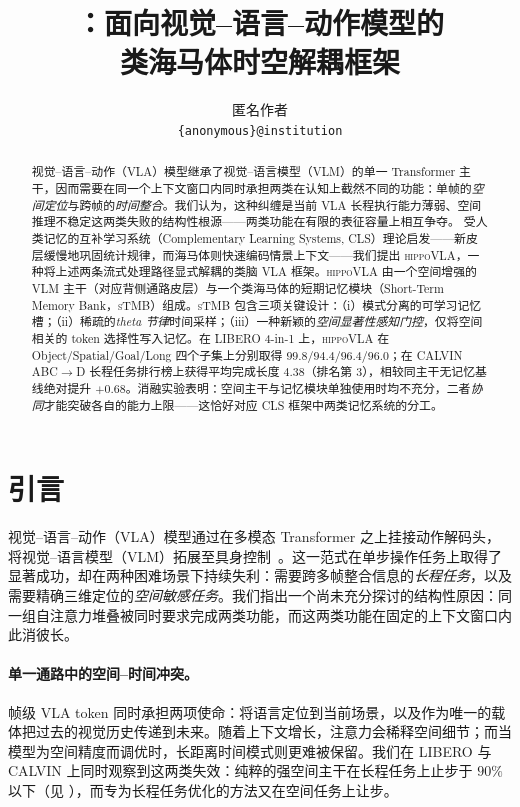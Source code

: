 \documentclass[10pt,letterpaper,fontset=fandol]{ctexart}
\title{\method：面向视觉--语言--动作模型的\\
类海马体时空解耦框架}
\author{
    匿名作者\\
    \texttt{\{anonymous\}@institution}
}
\date{}
\newcommand{\method}{\textsc{hippoVLA}\xspace}
\newcommand{\sTMB}{\textsc{sTMB}\xspace}
\begin{document}
\maketitle

\begin{abstract}
视觉--语言--动作（VLA）模型继承了视觉--语言模型（VLM）的单一 Transformer 主干，因而需要在同一个上下文窗口内同时承担两类在认知上截然不同的功能：单帧的\emph{空间定位}与跨帧的\emph{时间整合}。我们认为，这种纠缠是当前 VLA 长程执行能力薄弱、空间推理不稳定这两类失败的结构性根源——两类功能在有限的表征容量上相互争夺。
受人类记忆的互补学习系统（Complementary Learning Systems, CLS）理论启发——新皮层缓慢地巩固统计规律，而海马体则快速编码情景上下文——我们提出 \method，一种将上述两条流式处理路径显式解耦的类脑 VLA 框架。\method 由一个空间增强的 VLM 主干（对应背侧通路皮层）与一个类海马体的短期记忆模块（Short-Term Memory Bank，\sTMB）组成。\sTMB 包含三项关键设计：（i）模式分离的可学习记忆槽；（ii）稀疏的\emph{theta 节律}时间采样；（iii）一种新颖的\emph{空间显著性感知门控}，仅将空间相关的 token 选择性写入记忆。在 LIBERO 4-in-1 上，\method 在 Object/Spatial/Goal/Long 四个子集上分别取得 $99.8/94.4/96.4/96.0$；在 CALVIN ABC$\rightarrow$D 长程任务排行榜上获得平均完成长度 $4.38$（排名第 3），相较同主干无记忆基线绝对提升 $+0.68$。消融实验表明：空间主干与记忆模块单独使用时均不充分，二者\emph{协同}才能突破各自的能力上限——这恰好对应 CLS 框架中两类记忆系统的分工。
\end{abstract}

\section{引言}
\label{sec:intro}

视觉--语言--动作（VLA）模型通过在多模态 Transformer 之上挂接动作解码头，将视觉--语言模型（VLM）拓展至具身控制~\citep{black2024pi0,kim2024openvla,brohan2023rt2}。这一范式在单步操作任务上取得了显著成功，却在两种困难场景下持续失利：需要跨多帧整合信息的\emph{长程任务}，以及需要精确三维定位的\emph{空间敏感任务}。我们指出一个尚未充分探讨的结构性原因：同一组自注意力堆叠被同时要求完成两类功能，而这两类功能在固定的上下文窗口内此消彼长。

\paragraph{单一通路中的空间--时间冲突。}
帧级 VLA token 同时承担两项使命：将语言定位到当前场景，以及作为唯一的载体把过去的视觉历史传递到未来。随着上下文增长，注意力会稀释空间细节；而当模型为空间精度而调优时，长距离时间模式则更难被保留。我们在 LIBERO 与 CALVIN 上同时观察到这两类失效：纯粹的强空间主干在长程任务上止步于 $90\%$ 以下（见 ），而专为长程任务优化的方法又在空间任务上让步。
\end{document}
